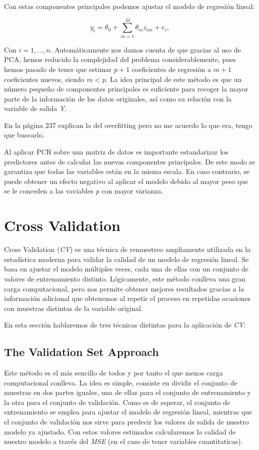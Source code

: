 \documentclass[12pt,a4paper,Spanish]{book}
\begin{document}
Con estas componentes principales podemos ajustar el modelo de regresión lineal:

\begin{equation}
y_i = \theta_0+\sum_{m=1}^{M}\theta_mz_{im}+e_i,      
\end{equation}

Con $i=1,...,n$. Automáticamente nos damos cuenta de que gracias al uso de PCA, hemos reducido la complejidad del problema considerablemente, pues hemos pasado de tener que estimar $p+1$ coeficientes de regresión a $m+1$ coeficientes nuevos, siendo $m<p$. La idea principal de este método es que un número pequeño de componentes principales es suficiente para recoger la mayor parte de la información de los datos originales, así como su relación con la variable de salida \textit{Y}.

En la página 237 explican lo del overfitting pero no me acuerdo lo que era, tengo que buscarlo.

Al aplicar PCR sobre una matriz de datos es importante estandarizar los predictores antes de calcular las nuevas componentes principales. De este modo se garantiza que todas las variables están en la misma escala. En caso contrario, se puede obtener un efecto negativo al aplicar el modelo debido al mayor peso que se le conceden a las vaviables \textit{p} con mayor varianza.

\section{Cross Validation}

Cross Validation (\textit{CV}) es una técnica de remuestreo ampliamente utilizada en la estadística moderna para validar la calidad de un modelo de regresión lineal. Se basa en ajustar el modelo múltiples veces, cada una de ellas con un conjunto de valores de entrenamiento distinto. Lógicamente, este método conlleva una gran carga computacional, pero nos permite obtener mejores resultados gracias a la información adicional que obtenemos al repetir el proceso en repetidas ocasiones con muestras distintas de la variable original.


En esta sección hablaremos de tres técnicas distintas para la aplicación de \textit{CV}:

\subsection{The Validation Set Approach}

Este método es el más sencillo de todos y por tanto el que menos carga computacional conlleva. La idea es simple, consiste en dividir el conjunto de muestras en dos partes iguales, una de ellas para el conjunto de entrenamiento y la otra para el conjunto de validación. Como es de esperar, el conjunto de entrenamiento se emplea para ajustar el modelo de regresión lineal, mientras que el conjunto de validación nos sirve para predecir los valores de salida de nuestro modelo ya ajustado. Con estos valores estimados calcularemos la calidad de nuestro modelo a través del \textit{MSE} (en el caso de tener variables cuantitaticas).
\end{document}
